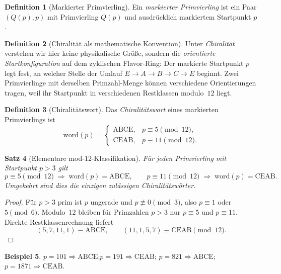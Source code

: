 \documentclass[11pt,a4paper]{article}
\theoremstyle{definition}
\newtheorem{definition}{Definition}[section]
\newtheorem{beispiel}[definition]{Beispiel}
\theoremstyle{plain}
\newtheorem{satz}[definition]{Satz}
\begin{document}
	\begin{definition}[Markierter Primvierling]
		Ein \emph{markierter Primvierling} ist ein Paar $(Q(p),p)$ mit Primvierling $Q(p)$ und ausdrücklich markiertem Startpunkt $p$.
	\end{definition}
	
	\begin{definition}[Chiralität als mathematische Konvention]
		Unter \emph{Chiralität} verstehen wir hier keine physikalische Größe, sondern die \emph{orientierte Startkonfiguration} auf dem zyklischen Flavor-Ring: Der markierte Startpunkt $p$ legt fest, an welcher Stelle der Umlauf $E\to A\to B\to C\to E$ beginnt. Zwei Primvierlinge mit derselben Primzahl-Menge können verschiedene Orientierungen tragen, weil ihr Startpunkt in verschiedenen Restklassen modulo~$12$ liegt.
	\end{definition}
	
	\begin{definition}[Chiralitätswort]
		Das \emph{Chiralitätswort} eines markierten Primvierlings ist
		\[
		\mathrm{word}(p)=
		\begin{cases}
			\mathrm{ABCE}, & p\equiv 5\pmod{12},\\[4pt]
			\mathrm{CEAB}, & p\equiv 11\pmod{12}.
		\end{cases}
		\]
	\end{definition}
	
	\begin{satz}[Elementare mod-$12$-Klassifikation]\label{satz:mod12}
		Für jeden Primvierling mit Startpunkt $p>3$ gilt
		\[
		p\equiv 5\pmod{12}\;\Longrightarrow\;\mathrm{word}(p)=\mathrm{ABCE},\qquad
		p\equiv 11\pmod{12}\;\Longrightarrow\;\mathrm{word}(p)=\mathrm{CEAB}.
		\]
		Umgekehrt sind dies die einzigen zulässigen Chiralitätswörter.
	\end{satz}
	
	\begin{proof}
		Für $p>3$ prim ist $p$ ungerade und $p\not\equiv 0\pmod 3$, also $p\equiv 1$ oder $5\pmod 6$. Modulo~$12$ bleiben für Primzahlen $p>3$ nur $p\equiv 5$ und $p\equiv 11$. Direkte Restklassenrechnung liefert
		\[
		(5,7,11,1)\equiv \mathrm{ABCE},\qquad (11,1,5,7)\equiv \mathrm{CEAB}\pmod{12}.
		\]
	\end{proof}
	
	\begin{beispiel}
		$p=101\Rightarrow \mathrm{ABCE}$;\quad $p=191\Rightarrow \mathrm{CEAB}$;\quad
		$p=821\Rightarrow \mathrm{ABCE}$;\quad $p=1871\Rightarrow \mathrm{CEAB}$.
	\end{beispiel}
	
\end{document}
